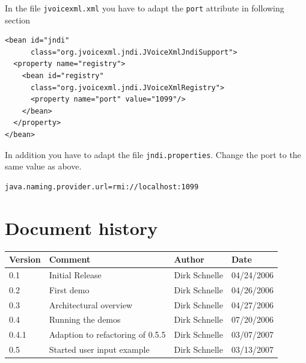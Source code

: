 \documentclass[11pt,a4paper]{article}
\begin{document}
In the file \texttt{jvoicexml.xml} you have to adapt the \texttt{port} 
attribute in following section

\begin{lstlisting}
<bean id="jndi" 
      class="org.jvoicexml.jndi.JVoiceXmlJndiSupport">
  <property name="registry">
    <bean id="registry"
      class="org.jvoicexml.jndi.JVoiceXmlRegistry">
      <property name="port" value="1099"/>
	</bean>
  </property>
</bean>
\end{lstlisting}

In addition you have to adapt the file \texttt{jndi.properties}.
Change the port to the same value as above.

\begin{lstlisting}
java.naming.provider.url=rmi://localhost:1099
\end{lstlisting}

\section*{Document history}

\begin{tabular}{|l|p{5cm}|l|l|}
\hline
\textbf{Version} & \textbf{Comment} & \textbf{Author} & \textbf{Date} \\
\hline
\hline
0.1 & Initial Release & Dirk Schnelle & 04/24/2006 \\
\hline
0.2 & First demo & Dirk Schnelle & 04/26/2006 \\
\hline
0.3 & Architectural overview & Dirk Schnelle & 04/27/2006 \\
\hline
0.4 & Running the demos & Dirk Schnelle & 07/20/2006 \\
\hline
0.4.1 & Adaption to refactoring of 0.5.5 & Dirk Schnelle & 03/07/2007 \\
\hline
0.5 & Started user input example & Dirk Schnelle & 03/13/2007 \\
\hline
\end{tabular}




\end{document}
